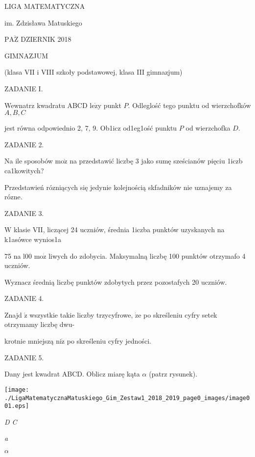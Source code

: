 \documentclass[a4paper,12pt]{article}
\begin{document}
LIGA MATEMATYCZNA

im. Zdzisława Matuskiego

$\mathrm{P}\mathrm{A}\dot{\mathrm{Z}}$ DZIERNIK 2018

GIMNAZJUM

(klasa VII i VIII szkoły podstawowej, klasa III gimnazjum)

ZADANIE I.

Wewnatrz kwadratu ABCD $\mathrm{l}\mathrm{e}\dot{\mathrm{z}}\mathrm{y}$ punkt $P$. Odleglość tego punktu od wierzchofków $A, B, C$

jest równa odpowiednio 2, 7, 9. Ob1icz od1eg1ość punktu $P$ od wierzchofka $D.$

ZADANIE 2.

Na ile sposobów $\mathrm{m}\mathrm{o}\dot{\mathrm{z}}$ na przedstawić liczbę 3 jako sumę sześcianów pięciu 1iczb ca1kowitych?

Przedstawień rózniących się jedynie kolejnością skfadników nie uznajemy za rózne.

ZADANIE 3.

$\mathrm{W}$ klasie VII, liczącej 24 uczniów, średnia 1iczba punktów uzyskanych na k1asówce wynios1a

75 na l00 $\mathrm{m}\mathrm{o}\dot{\mathrm{z}}$ liwych do zdobycia. Maksymalną liczbę 100 punktów otrzymafo 4 uczniów.

Wyznacz średnią liczbę punktów zdobytych przez pozostafych 20 uczniów.

ZADANIE 4.

Znajd $\acute{\mathrm{z}}$ wszystkie takie liczby trzycyfrowe, $\dot{\mathrm{z}}\mathrm{e}$ po skreśleniu cyfry setek otrzymamy liczbę dwu-

krotnie mniejszą $\mathrm{n}\mathrm{i}\dot{\mathrm{z}}$ po skreśleniu cyfry jedności.

ZADANIE 5.

Dany jest kwadrat ABCD. Oblicz miarę kąta $\alpha$ (patrz rysunek).
\begin{center}
\texttt{[image: ./LigaMatematycznaMatuskiego\_Gim\_Zestaw1\_2018\_2019\_page0\_images/image001.eps]}
\end{center}
{\it D  C}

{\it a}

$\alpha$
\end{document}
